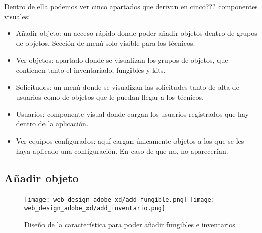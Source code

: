 Dentro de ella podemos ver cinco apartados que derivan en cinco??? componentes visuales:

\begin{itemize}
    \item Añadir objeto: un acceso rápido donde poder añadir objetos dentro de grupos de objetos. Sección de menú solo visible para los técnicos.
    \item Ver objetos: apartado donde se visualizan los grupos de objetos, que contienen tanto el inventariado, fungibles y kits.
    \item Solicitudes: un menú donde se visualizan las solicitudes tanto de alta de usuarios como de objetos que le puedan llegar a los técnicos.
    \item Usuarios: componente visual donde cargan los usuarios registrados que hay dentro de la aplicación.
    \item Ver equipos configurados: aquí cargan únicamente objetos a los que se les haya aplicado una configuración. En caso de que no, no aparecerían.
\end{itemize}

\subsection{Añadir objeto}
\begin{figure}
    \begin{center}
        \texttt{[image: web\_design\_adobe\_xd/add\_fungible.png]}
        \texttt{[image: web\_design\_adobe\_xd/add\_inventario.png]}
        \caption{Diseño de la característica para poder añadir fungibles e inventarios}
    \end{center}
\end{figure}

